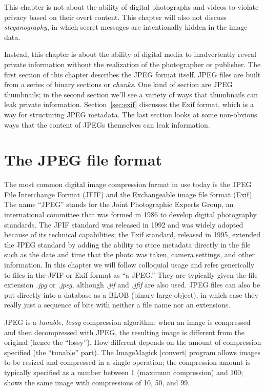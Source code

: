 
This chapter is not about the ability of digital photographs and
videos to violate privacy based on their overt content. This chapter
will also not discuss \emph{steganography}, in which secret messages
are intentionally hidden in the image data.

Instead, this chapter is about the ability of digital media to
inadvertently reveal private information without the realization of
the photographer or publisher.  The first section of this chapter
describes the JPEG format itself. JPEG files are built from a series
of binary sections or \emph{chunks}. One kind of section are JPEG
thumbnails; in the second section we'll see a variety of ways that
thumbnails can leak private information. Section~\ref{sec:exif}
discusses the Exif format, which is a way for structuring JPEG
metadata. The last section looks at some non-obvious ways that the
content of JPEGs themselves can leak information.

\section{The JPEG file format}

The most common digital image compression format in use today is the
JPEG File Interchange Format (JFIF) and the Exchangeable image file
format (Exif). The name ``JPEG'' stands for the Joint Photographic Experts
Group, an international committee that was formed in 1986 to develop digital
photography standards.  The JFIF standard was released in 1992 and was
widely adopted because of its technical capabilities; the Exif
standard, released in 1995, extended the JPEG standard by adding the
ability to store metadata directly in the file such as the date and
time that the photo was taken, camera settings, and other
information. In this chapter we will follow colloquial usage and refer
generically to files in the JFIF or Exif format as ``a JPEG.'' They
are typically given the file extension \emph{.jpg} or \emph{.jpeg},
although \emph{.jif} and \emph{.jfif} are also used. JPEG files can
also be put directly into a database as a BLOB (binary large
object), in which case they really just a sequence of bits with neither a file name nor an extensions.

JPEG is a \emph{tunable, lossy} compression algorithm: when an image
is compressed and then decompressed with JPEG, the resulting image is
different from the original (hence the ``lossy''). How different depends on the amount of
compression specified (the ``tunable'' part). The ImageMagick |convert| program allows images
to be resized and compressed in a single operation; the compression
amount is typically specified as a number between 1 (maximum compression) and 100;
 shows the same image with compressions of 10, 50,
and 99.

